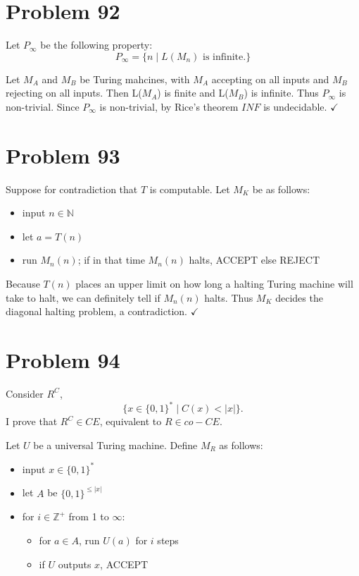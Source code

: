 \documentclass[11pt]{article}
\begin{document}
\section*{Problem 92}

Let $P_\infty$ be the following property:
	\[ P_\infty = \{ n \mid L(M_n) \text{ is infinite}. \}\] 

Let $M_A$ and $M_B$ be Turing mahcines, with $M_A$ accepting on all inputs and $M_B$ rejecting on all inputs.
Then L($M_A$) is finite and L($M_B$) is infinite. 
Thus $P_\infty$ is non-trivial.
Since $P_\infty$ is non-trivial, by Rice's theorem $INF$ is undecidable. $\checkmark$



\section*{Problem 93}

Suppose for contradiction that $T$ is computable.
Let $M_K$ be as follows:
\begin{itemize}
	\item input $n \in \mathbb{N}$
	\item let $a = T(n)$
	\item run $M_n(n)$; if in that time $M_n(n)$ halts, ACCEPT else REJECT
\end{itemize}

Because $T(n)$ places an upper limit on how long a halting Turing machine will take to halt, we can definitely tell if $M_n(n)$ halts.
Thus $M_K$ decides the diagonal halting problem, a contradiction. $\checkmark$


\section*{Problem 94}

Consider $R^C$,
	\[ \{x \in \{0,1\}^* \mid C(x) < |x| \}. \]
I prove that $R^C \in CE$, equivalent to $R \in co-CE$.

Let $U$ be a universal Turing machine.
Define $M_R$ as follows:
\begin{itemize}
	\item input $x \in \{0,1\}^* $
	\item let $A$ be $\{0,1\}^{\leq |x|}$
	\item for $i \in \mathbb{Z}^+$ from 1 to $\infty$:
	\begin{itemize}
		\item for $a \in A$, run $U(a)$ for $i$ steps
		\item if $U$ outputs $x$, ACCEPT
	\end{itemize}
\end{itemize}
\end{document}
